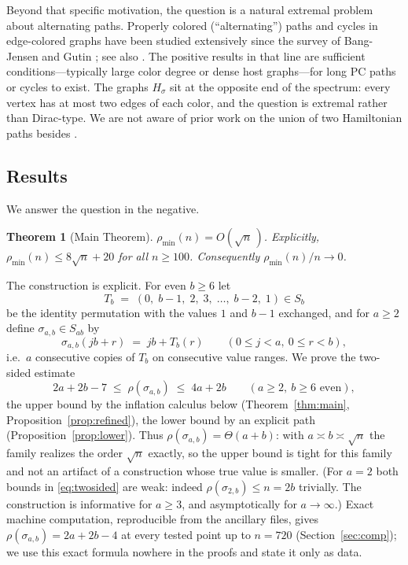 \documentclass[11pt]{article}
\newtheorem{theorem}{Theorem}[section]
\theoremstyle{definition}
\newcommand{\pmin}{\rho_{\min}}
\begin{document}
Beyond that specific motivation, the question is a natural extremal problem about
alternating paths. Properly colored (``alternating'') paths and cycles in edge-colored
graphs have been studied extensively since the survey of Bang-Jensen and Gutin
\cite{BJG97}; see also \cite{GK09,ABMMM10}. The positive results in that line are
sufficient conditions---typically large color degree or dense host graphs---for long
PC paths or cycles to exist. The graphs $H_\sigma$ sit at the opposite end of the
spectrum: every vertex has at most two edges of each color, and the question is
extremal rather than Dirac-type. We are not aware of prior work on the union of two
Hamiltonian paths besides \cite{Liz26}.

\subsection{Results}

We answer the question in the negative.

\begin{theorem}[Main Theorem]\label{thm:main-intro}
$\pmin(n) = O(\sqrt n\,)$. Explicitly, $\pmin(n) \le 8\sqrt n + 20$ for all
$n \ge 100$. Consequently $\pmin(n)/n \to 0$.
\end{theorem}

The construction is explicit. For even $b\ge 6$ let
\[
T_b \;=\; (0,\; b{-}1,\; 2,\; 3,\; \dots,\; b{-}2,\; 1) \in S_b
\]
be the identity permutation with the values $1$ and $b-1$ exchanged, and for $a \ge 2$
define $\sigma_{a,b} \in S_{ab}$ by
\[
\sigma_{a,b}(jb + r) \;=\; jb + T_b(r) \qquad (0 \le j < a,\ 0 \le r < b),
\]
i.e.\ $a$ consecutive copies of $T_b$ on consecutive value ranges. We prove the
two-sided estimate
\begin{equation}\label{eq:twosided}
2a + 2b - 7 \;\le\; \rho(\sigma_{a,b}) \;\le\; 4a + 2b
\qquad (a \ge 2,\ b \ge 6 \text{ even}),
\end{equation}
the upper bound by the inflation calculus below
(Theorem~\ref{thm:main}, Proposition~\ref{prop:refined}), the lower bound by an
explicit path (Proposition~\ref{prop:lower}). Thus $\rho(\sigma_{a,b}) = \Theta(a+b)$:
with $a \asymp b \asymp \sqrt n$ the family realizes the order $\sqrt n$ exactly, so
the upper bound is tight for this family and not an artifact of a construction whose
true value is smaller. (For $a = 2$ both bounds in \eqref{eq:twosided} are weak: indeed
$\rho(\sigma_{2,b}) \le n = 2b$ trivially. The construction is informative for
$a \ge 3$, and asymptotically for $a \to \infty$.) Exact machine computation,
reproducible from the ancillary files, gives $\rho(\sigma_{a,b}) = 2a + 2b - 4$ at
every tested point up to $n = 720$ (Section~\ref{sec:comp}); we use this exact
formula nowhere in the proofs and state it only as data.
\end{document}
